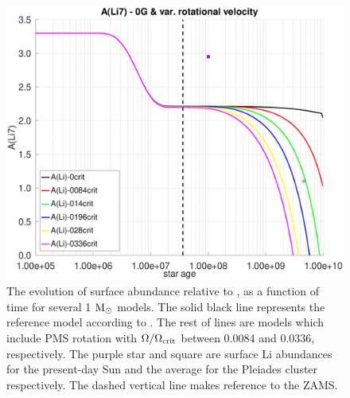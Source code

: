 \documentclass[fleqn,usenatbib]{mnras}
\begin{document}
\begin{ceqn}
\begin{figure}
	\includegraphics[trim = 25mm 10mm 15mm 10mm, clip, width=\columnwidth]{figures/paper1/li_var_vel_0_0g.eps}
    \caption{The evolution of surface  abundance relative to , as a function of time for several 1 $\mathrm{M}_\odot$ models. The solid black line represents the reference model according to \citet{Choi2016}. The rest of lines are models which include PMS rotation with $\Omega / \Omega_{\mathrm{crit}}$ between 0.0084 and 0.0336, respectively. The purple star and square are surface Li abundances for the present-day Sun \citep{Asplund2009} and the average for the Pleiades cluster \citep{Sestito2005} respectively. The dashed vertical line makes reference to the ZAMS.}
    \label{fig:li_var_vel_0g}
\end{figure}


\end{ceqn}
\end{document}
